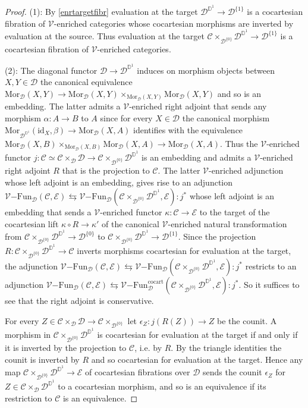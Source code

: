 \documentclass[10pt,oneside]{article}
\numberwithin{equation}{section} %
\numberwithin{figure}{section} %
\theoremstyle{plain}
\theoremstyle{definition}
\newcommand{\bD}{{\mathbb D}}
\newcommand{\mC}{{\mathcal C}}
\newcommand{\mD}{{\mathcal D}}
\newcommand{\mE}{{\mathcal E}}
\newcommand{\mV}{{\mathcal V}}
\newcommand{\bj}{{j}}
\newcommand{\id}{\mathrm{id}}
\newcommand{\Fun}{\mathrm{Fun}}
\newcommand{\cocart}{{\mathrm{cocart}}}
\newcommand{\Mor}{{\mathrm{Mor}}}
\begin{document}
\begin{proof}

(1): By \cref{enrtargetfibr} evaluation at the target $\mD^{\bD^1} \to \mD^{\{1\}}$ is a cocartesian fibration of $\mV$-enriched categories whose cocartesian morphisms are inverted by evaluation at the source. Thus evaluation at the target $\mC \times_{\mD^{\{0\}}} \mD^{\bD^1} \to \mD^{\{1\}}$ is a cocartesian fibration of $\mV$-enriched categories.

(2): The diagonal functor $\mD \to \mD^{\bD^1} $
induces on morphism objects between $X,Y \in \mD$ the canonical equivalence
$\Mor_\mD(X,Y) \to \Mor_\mD(X,Y) \times_{\Mor_\mD(X,Y)} \Mor_\mD(X,Y) $ and so is an embedding.
The latter admits a $\mV$-enriched right adjoint that sends any morphism
$\alpha: A \to B$ to $A$ since for every $X \in \mD$ the canonical morphism
$ \Mor_{\mD^{\bD^1}}(\id_X,\beta) \to\Mor_\mD(X,A)  $
identifies with the equivalence $\Mor_\mD(X,B) \times_{\Mor_\mD(X,B)} \Mor_\mD(X,A) \to \Mor_\mD(X,A)  $.
Thus the $\mV$-enriched functor
$\bj: \mC \simeq \mC \times_{\mD} \mD \to \mC \times_{\mD^{\{0\}}} \mD^{\bD^1}$ is an embedding and admits a $\mV$-enriched right adjoint $R$ that is the projection to $\mC.$
The latter $\mV$-enriched adjunction whose left adjoint is an embedding, gives rise to an adjunction 
$ {\mV\mathrm{-}\Fun}_\mD(\mC,\mE) \leftrightarrows {\mV\mathrm{-}\Fun}_\mD(\mC \times_{\mD^{\{0\}}} \mD^{\bD^1},\mE) : \bj^* $ whose left adjoint is an embedding
that sends a $\mV$-enriched functor $\kappa: \mC \to \mE$ to
the target of the cocartesian lift $\kappa \circ R \to \kappa' $
of the canonical $\mV$-enriched natural transformation from 
$\mC \times_{\mD^{\{0\}}} \mD^{\bD^1} \to \mD^{\{0\}}$ to
$\mC \times_{\mD^{\{0\}}} \mD^{\bD^1} \to \mD^{\{1\}}$.
Since the projection 
$R: \mC \times_{\mD^{\{0\}}} \mD^{\bD^1} \to \mC$ inverts morphisms cocartesian for evaluation at the target, the adjunction
$ {\mV\mathrm{-}\Fun}_\mD(\mC,\mE) \leftrightarrows {\mV\mathrm{-}\Fun}_\mD(\mC \times_{\mD^{\{0\}}} \mD^{\bD^1},\mE) : \bj^* $ restricts to an adjunction
$ {\mV\mathrm{-}\Fun}_\mD(\mC,\mE) \leftrightarrows {\mV\mathrm{-}\Fun}^\cocart_\mD(\mC \times_{\mD^{\{0\}}} \mD^{\bD^1},\mE) : \bj^*. $
So it suffices to see that the right adjoint is conservative.

For every $Z \in \mC \times_{\mD} \mD \to \mC \times_{\mD^{\{0\}}} $ 
let $\epsilon_Z: \bj(R(Z)) \to Z $ be the counit.
A morphism in $ \mC \times_{\mD^{\{0\}}} \mD^{\bD^1}$ is cocartesian for evaluation at the target if and only if it is inverted by the projection to $\mC$, i.e. by $R$.
By the triangle identities the counit is inverted by $R$ and so cocartesian for evaluation at the target.
Hence any map $ \mC \times_{\mD^{\{0\}}} \mD^{\bD^1} \to \mE$
of cocartesian fibrations over $\mD$ sends the counit
$\epsilon_Z$ for $Z \in \mC \times_{\mD} \mD^{\bD^1} $ to a cocartesian morphism,
and so is an equivalence if its restriction to $\mC$ is an equivalence.
\end{proof}
\end{document}
